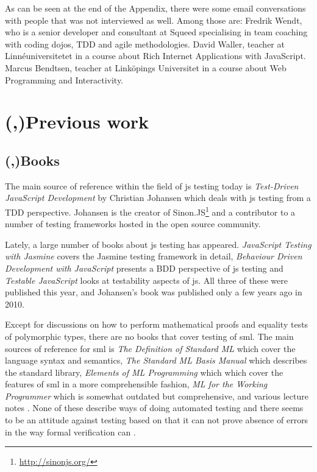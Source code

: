 \documentclass[11pt]{article}
\begin{document}
As can be seen at the end of the Appendix, there were some email conversations with people that was not interviewed as well. Among those are: Fredrik Wendt, who is a senior developer and consultant at Squeed specialising in team coaching with coding dojos, TDD and agile methodologies. David Waller, teacher at Linnéuniversitetet in a course about Rich Internet Applications with JavaScript. Marcus Bendtsen, teacher at Linköpings Universitet in a course about Web Programming and Interactivity.

\section{(,)Previous work}

\subsection{(,)Books}

The main source of reference within the field of \gls{js} testing today is \emph{Test-Driven JavaScript Development} \cite{Tddjs} by Christian Johansen which deals with \gls{js} testing from a TDD perspective. Johansen is the creator of Sinon.JS\footnote{\url{http://sinonjs.org/}} and a contributor to a number of testing frameworks hosted in the open source community.

Lately, a large number of books about \gls{js} testing has appeared. \emph{JavaScript Testing with Jasmine} \cite{JasmineBook} covers the Jasmine testing framework in detail, \emph{Behaviour Driven Development with JavaScript} \cite{BDDJS} presents a BDD perspective of \gls{js} testing and \emph{Testable JavaScript} \cite{TestableJS} looks at testability aspects of \gls{js}. All three of these were published this year, and Johansen's book was published only a few years ago in 2010.

Except for discussions on how to perform mathematical proofs and equality tests of polymorphic types, there are no books that cover testing of \gls{sml}. The main sources of reference for \gls{sml} is \emph{The Definition of Standard ML} \cite{DefinitionStandardML} which cover the language syntax and semantics, \emph{The Standard ML Basis Manual} \cite{BasisManual} which describes the standard library, \emph{Elements of ML Programming} which \cite{ElementsML} which cover the features of \gls{sml} in a more comprehensible fashion, \emph{ML for the Working Programmer} \cite{WorkingProgrammer} which is somewhat outdated but comprehensive, and various lecture notes \cite{ProgSml97}\cite{ProgSmlHarper}\cite{FunctionalML}\cite{NotesSMLNJ}. None of these describe ways of doing automated testing and there seems to be an attitude against testing based on that it can not prove absence of errors in the way formal verification can \cite[p.~16]{ProgSmlHarper}.
\end{document}
